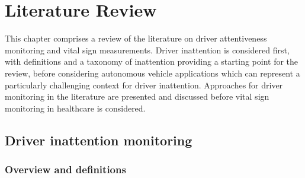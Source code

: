 \documentclass[11pt, parskip=half*,twoside=false]{scrbook}
\begin{document}


\chapter{Literature Review} \label{ch:litreview}
This chapter comprises a review of the literature on driver attentiveness monitoring and vital sign measurements. Driver inattention is considered first, with definitions and a taxonomy of inattention providing a starting point for the review, before considering autonomous vehicle applications which can represent a particularly challenging context for driver inattention. Approaches for driver monitoring in the literature are presented and discussed before vital sign monitoring in healthcare is considered.

\section{Driver inattention monitoring} \label{sec:distraction}
\subsection{Overview and definitions} \label{ssec:overview}
%
\end{document}
